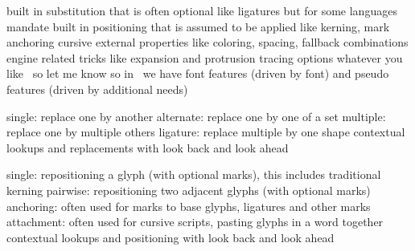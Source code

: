 
\definecolor[maincolor][r=.4,g=.4]

\startdocument[title=Font features,subtitle={\CONTEXT\ 2017 Maibach}]

\startchapter[title=What are they]

\startitemize
    \startitem
        built in substitution that is often optional like ligatures but for some
        languages mandate
    \stopitem
    \startitem
        built in positioning that is assumed to be applied like kerning, mark
        anchoring cursive
    \stopitem
    \startitem
        external properties like coloring, spacing, fallback combinations
    \stopitem
    \startitem
        engine related tricks like expansion and protrusion
    \stopitem
    \startitem
        tracing options
    \stopitem
    \startitem
        whatever you like \unknown\ so let me know
    \stopitem
    \blank[2*big]
    \startitem
        so in \CONTEXT\ we have font features (driven by font) and pseudo
        features (driven by additional needs)
    \stopitem
\stopitemize

\stopchapter

\startchapter[title=Substitution]

\startitemize
    \startitem
        single: replace one by another
    \stopitem
    \startitem
        alternate: replace one by one of a set
    \stopitem
    \startitem
        multiple: replace one by multiple others
    \stopitem
    \startitem
        ligature: replace multiple by one shape
    \stopitem
    \blank[2*big]
    \startitem
        contextual lookups and replacements with look back and look ahead
    \stopitem
\stopitemize

\stopchapter

\startchapter[title=Positioning]

\startitemize
    \startitem
        single: repositioning a glyph (with optional marks), this includes
        traditional kerning
    \stopitem
    \startitem
        pairwise: repositioning two adjacent glyphs (with optional marks)
    \stopitem
    \startitem
        anchoring: often used for marks to base glyphs, ligatures and other marks
    \stopitem
    \startitem
        attachment: often used for cursive scripts, pasting glyphs in a word together
    \stopitem
    \blank[2*big]
    \startitem
        contextual lookups and positioning with look back and look ahead
    \stopitem
\stopitemize

\stopchapter

